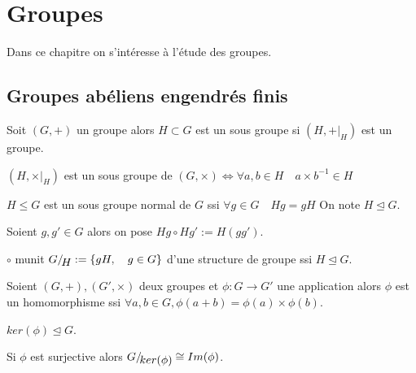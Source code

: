 \chapter{Groupes}
\label{cha:groupes}

Dans ce chapitre on s'intéresse à l'étude des groupes.

\section{Groupes abéliens engendrés finis}

 \begin{definition}
    \label{def:49}
    Soit $(G,+)$ un groupe alors $H\subset G$ est un sous groupe si $(H,+|_{ H })$ est un groupe.
 \end{definition}
 
 \begin{lemma}
    \label{lem:23}
    $(H,\times|_H)$ est un sous groupe de $(G,\times) \Leftrightarrow \forall a,b \in H\quad a\times b^{-1} \in H$
   \end{lemma}
   
    \begin{definition}
    \label{def:49}
    $H\le G$ est un sous groupe normal de $G$ ssi $\forall g \in G\quad Hg=gH$ On note $H\unlhd G$.
     \end{definition}
     
      \begin{definition}
    \label{def:49}
    Soient $g,g' \in G$ alors on pose $Hg \circ Hg' := H(gg')$.
     \end{definition}
     
     \begin{theorem}
    \label{thr:28}
    $\circ$  munit $G/\!\raisebox{-.65ex}{\ensuremath{{H}}}  := \left\{ gH,\quad g\in G \right\}$ d'une structure de groupe ssi $H\unlhd G$.
    \end{theorem}
    
       \begin{definition}
    \label{def:49}
    Soient $(G,+),(G',\times)$ deux groupes et $\phi :G\rightarrow G'$ une application alors $\phi$ est un homomorphisme ssi 
    $\forall a,b \in G, \phi(a+b)=\phi(a) \times \phi(b)$.
    \end{definition}
    
    \begin{remark}
    $ker(\phi) \unlhd G$.
    \end{remark}
    
     \begin{theorem}
    \label{thr:28}
    Si $\phi$ est surjective alors $G/\!\raisebox{-.65ex}{\ensuremath{{ker(\phi)}}} \cong Im(\phi)$.
     \end{theorem}
     
